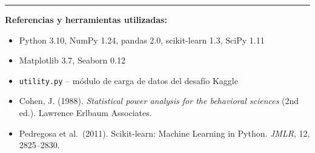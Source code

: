 \documentclass[12pt,a4paper]{article}
\begin{document}
\vspace{1em}
\hrule
\vspace{0.5em}
\small
\textbf{Referencias y herramientas utilizadas:}
\begin{itemize}[leftmargin=2em, topsep=2pt, itemsep=1pt]
  \item Python 3.10, NumPy 1.24, pandas 2.0, scikit-learn 1.3, SciPy 1.11
  \item Matplotlib 3.7, Seaborn 0.12
  \item \texttt{utility.py} -- módulo de carga de datos del desafío Kaggle
  \item Cohen, J. (1988). \textit{Statistical power analysis for the behavioral sciences}
    (2nd ed.). Lawrence Erlbaum Associates.
  \item Pedregosa et al.\ (2011). Scikit-learn: Machine Learning in Python.
    \textit{JMLR}, 12, 2825--2830.
\end{itemize}
\end{document}
